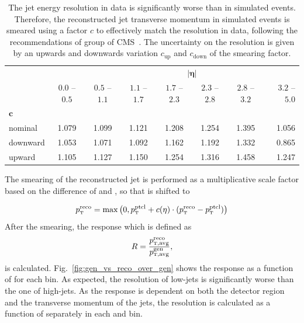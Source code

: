 \begin{table}[htbp]
\setlength\tabcolsep{4.5pt} 
    \centering
    \caption[Jet energy resolution scale factors]{
             The jet energy resolution in data is significantly worse than in
             simulated events. Therefore, the reconstructed jet transverse
             momentum in simulated events is smeared using a factor $c$ to
             effectively match the resolution in data, following the
             recommendations of \JetMET group of CMS~\cite{jetmet:resolution}.
             The uncertainty on the resolution is given by an upwards and
             downwards variation $c_\mathrm{up}$ and
             $c_\mathrm{down}$ of the smearing factor.}
    \label{tab:res_smearing}

    \begin{tabular}{lccccccr}
    \toprule
    & & \multicolumn{6}{c}{$\bm{|\eta|}$}\\\cmidrule{2-8}
               & $0.0$ -- $0.5$ & $0.5$ -- $1.1$ & $1.1$ -- $1.7$ & $1.7$ --
               $2.3$ & $2.3$ -- $2.8$ & $2.8$ -- $3.2$ & $3.2$ -- $5.0$\\
               $\bm{c}$ &  &  &  & & & & \\\cmidrule{1-1}
    nominal    & 1.079                   & 1.099                   & 1.121    & 1.208                   & 1.254                   & 1.395    & 1.056\\
    downward       & 1.053                   & 1.071                   & 1.092    & 1.162                   & 1.192                   & 1.332 & 0.865\\
    upward         & 1.105                   & 1.127                   & 1.150 & 1.254                   & 1.316                   & 1.458 & 1.247\\
    \bottomrule
    \end{tabular}
\end{table}

The smearing of the reconstructed jet \pt is performed as a multiplicative scale
factor based on the difference of \ptreco and \ptgen, so that \ptreco is shifted
to

\begin{equation}
\ptreco = \max \left( 0, \ptgen + c(\eta) \cdot (\ptreco - \ptgen) \right)
\end{equation}
%
After the smearing, the response which is defined as
%
\begin{equation}
    R = \frac{\ptavg^{\text{reco}}}{\ptavg^{\text{gen}}},
\end{equation}
%
is calculated. Fig.~\ref{fig:gen_vs_reco_over_gen} shows the response as a
function of \ptgen for each bin. As expected, the resolution of low-\pt jets is
significantly worse than the one of high-\pt jets. As the response is dependent
on both the detector region and the transverse momentum of the jets, the resolution
is calculated as a function of \ptavggen separately in each \ystar and \yboost
bin. 

